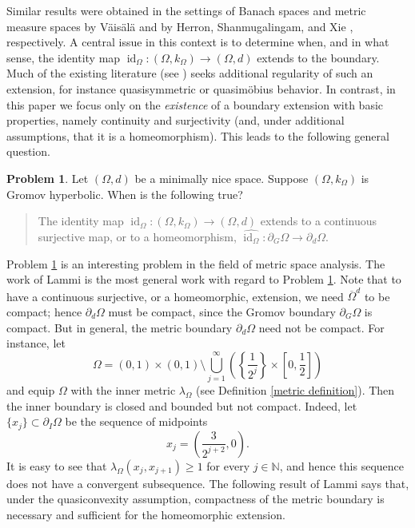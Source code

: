 \documentclass[a4paper,12pt]{amsart}
\theoremstyle{definition}
\newtheorem{prob}[equation]{Problem}
\begin{document}
Similar results were obtained in the settings of Banach spaces and metric measure spaces by V\"ais\"al\"a \cite[Theorem 2.29]{Vaisala-GH-1} and by Herron, Shanmugalingam, and Xie \cite{HSX-2008}, respectively. A central issue in this context is to determine when, and in what sense, the identity map 
$\operatorname{id}_\Omega:(\Omega,k_\Omega)\to (\Omega,d)$ 
extends to the boundary. Much of the existing literature (see \cite{BHK, Vaisala-GH-1, HSX-2008}) seeks additional regularity of such an extension, for instance quasisymmetric or quasim\"obius behavior. In contrast, in this paper we focus only on the \emph{existence} of a boundary extension with basic properties, namely continuity and surjectivity (and, under additional assumptions, that it is a homeomorphism). This leads to the following general question.
\begin{prob}\label{GB-MB}
	Let $(\Omega,d)$ be a minimally nice space. Suppose $(\Omega,k_{\Omega})$ is Gromov hyperbolic. When is the following true?
	
	\begin{quote}
		The identity map $\operatorname{id}_{\Omega}: (\Omega,k_{\Omega})\to (\Omega,d)$ extends to a continuous surjective map, or to a homeomorphism, $\widehat{\operatorname{id}_{\Omega}}:\partial_{G}\Omega\to \partial_d\Omega$.
	\end{quote}
\end{prob}

Problem \ref{GB-MB} is an interesting problem in the field of metric space analysis. The work of Lammi \cite{Lammi-2011,Lammi-Thesis} is the most general work with regard to Problem \ref{GB-MB}. Note that to have a continuous surjective, or a homeomorphic, extension, we need $\overline{\Omega}^d$ to be compact; hence $\partial_d\Omega$ must be compact, since the Gromov boundary $\partial_{G}\Omega$ is compact. But in general, the metric boundary $\partial_{d}\Omega$ need not be compact. For instance, let
$$
\Omega=(0,1)\times (0,1)\setminus \bigcup_{j=1}^\infty \left(\left\{\frac{1}{2^j}\right\}\times \left[0,\frac{1}{2}\right]\right)
$$
and equip $\Omega$ with the inner metric $\lambda_{\Omega}$ (see Definition \ref{metric definition}). Then the inner boundary is closed and bounded but not compact. Indeed, let $\{x_j\}\subset \partial_{I}\Omega$ be the sequence of midpoints
$$
x_j=\left(\frac{3}{2^{j+2}},0\right).
$$
It is easy to see that $\lambda_{\Omega}(x_{j},x_{j+1})\ge 1$ for every $j\in \mathbb{N}$, and hence this sequence does not have a convergent subsequence. The following result of Lammi \cite{Lammi-Thesis} says that, under the quasiconvexity assumption, compactness of the metric boundary is necessary and sufficient for the homeomorphic extension.
\end{document}
